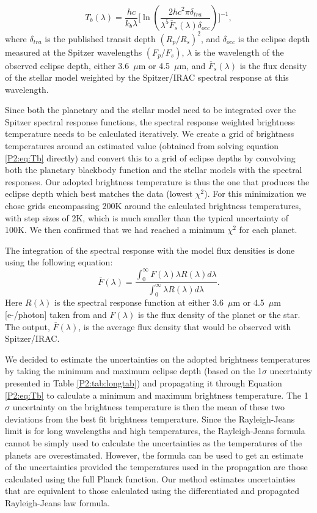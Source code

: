 \begin{equation}
    T_b (\lambda) = \frac{hc}{k_b\lambda} \Big[ \ln \left( \frac{2hc^2\pi \delta_{tra} }{\lambda^5 \overline{F}_{s}(\lambda) \delta_{occ} }   \right) \Big]^{-1},
    \label{P2:eq:Tb}
\end{equation}where $\delta_{tra}$ is the published transit depth $(R_p/R_s)^2$, and $\delta_{occ}$ is the eclipse depth measured at the Spitzer wavelengths $(F_p/F_s)$, $\lambda$ is the wavelength of the observed eclipse depth, either 3.6~$\mu$m or 4.5~$\mu$m, and $\overline{F}_{s}(\lambda)$ is the flux density of the stellar model weighted by the Spitzer/IRAC spectral response at this wavelength.

Since both the planetary and the stellar model need to be integrated over the Spitzer spectral response functions, the spectral response weighted brightness temperature needs to be calculated iteratively. We create a grid of brightness temperatures around an estimated value (obtained from solving equation \ref{P2:eq:Tb} directly) and convert this to a grid of eclipse depths by convolving both the planetary blackbody function and the stellar models with the spectral responses. Our adopted brightness temperature is thus the one that produces the eclipse depth which best matches the data (lowest $\chi^2$). For this minimization we chose grids encompassing 200K around the calculated brightness temperatures, with step sizes of 2K, which is much smaller than the typical uncertainty of 100K. We then confirmed that we had reached a minimum $\chi^2$ for each planet.

The integration of the spectral response with the model flux densities is done using the following equation:
\begin{equation}
    \overline{F}(\lambda) = \frac{\int_0^\infty  F(\lambda) \lambda R(\lambda) d\lambda}{\int_0^\infty  \lambda R(\lambda) d\lambda}
.\end{equation}Here $R(\lambda)$ is the spectral response function at either 3.6~$\mu$m or 4.5~$\mu$m [e-/photon] taken from \citet{Quijada2004} and $F(\lambda)$ is the flux density of the planet or the star. The output, $\overline{F}(\lambda)$, is the average flux density that would be observed with Spitzer/IRAC.

We decided to estimate the uncertainties on the adopted brightness temperatures by taking the minimum and maximum eclipse depth (based on the 1$\sigma$ uncertainty presented in Table \ref{P2:tab:longtab}) and propagating it through Equation \ref{P2:eq:Tb} to calculate a minimum and maximum brightness temperature. The 1$\sigma$ uncertainty on the brightness temperature is then the mean of these two deviations from the best fit brightness temperature. Since the Rayleigh-Jeans limit is for long wavelengths and high temperatures, the Rayleigh-Jeans formula cannot be simply used to calculate the uncertainties as the temperatures of the planets are overestimated. However, the formula can be used to get an estimate of the uncertainties provided the temperatures used in the propagation are those calculated using the full Planck function. Our method  estimates uncertainties that are equivalent to those calculated using the differentiated and propagated Rayleigh-Jeans law formula.

